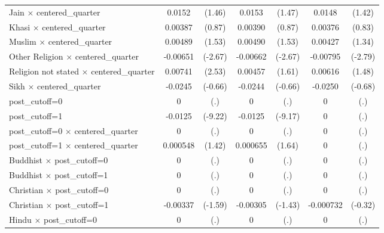 {\begin{tabular}{l*{3}{cc}}
Jain $\times$ centered\_quarter&      0.0152         &      (1.46)&      0.0153         &      (1.47)&      0.0148         &      (1.42)\\
Khasi $\times$ centered\_quarter&     0.00387         &      (0.87)&     0.00390         &      (0.87)&     0.00376         &      (0.83)\\
Muslim $\times$ centered\_quarter&     0.00489         &      (1.53)&     0.00490         &      (1.53)&     0.00427         &      (1.34)\\
Other Religion $\times$ centered\_quarter&    -0.00651\sym{**} &     (-2.67)&    -0.00662\sym{**} &     (-2.67)&    -0.00795\sym{**} &     (-2.79)\\
Religion not stated $\times$ centered\_quarter&     0.00741\sym{*}  &      (2.53)&     0.00457         &      (1.61)&     0.00616         &      (1.48)\\
Sikh $\times$ centered\_quarter&     -0.0245         &     (-0.66)&     -0.0244         &     (-0.66)&     -0.0250         &     (-0.68)\\
post\_cutoff=0       &           0         &         (.)&           0         &         (.)&           0         &         (.)\\
post\_cutoff=1       &     -0.0125\sym{***}&     (-9.22)&     -0.0125\sym{***}&     (-9.17)&           0         &         (.)\\
post\_cutoff=0 $\times$ centered\_quarter&           0         &         (.)&           0         &         (.)&           0         &         (.)\\
post\_cutoff=1 $\times$ centered\_quarter&    0.000548         &      (1.42)&    0.000655         &      (1.64)&           0         &         (.)\\
Buddhist $\times$ post\_cutoff=0&           0         &         (.)&           0         &         (.)&           0         &         (.)\\
Buddhist $\times$ post\_cutoff=1&           0         &         (.)&           0         &         (.)&           0         &         (.)\\
Christian $\times$ post\_cutoff=0&           0         &         (.)&           0         &         (.)&           0         &         (.)\\
Christian $\times$ post\_cutoff=1&    -0.00337         &     (-1.59)&    -0.00305         &     (-1.43)&   -0.000732         &     (-0.32)\\
Hindu $\times$ post\_cutoff=0&           0         &         (.)&           0         &         (.)&           0         &         (.)\\

\end{tabular}}
